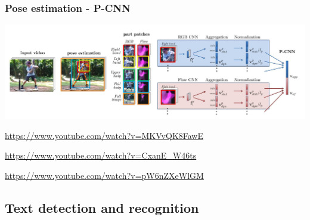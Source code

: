 \begin{frame}
	\frametitle{Pose estimation - P-CNN}
	
	
	\begin{center}
		\includegraphics[scale=0.5]{figs/P_CNN_structure}
	\end{center}
	
	\bigskip 
	
	
	\url{https://www.youtube.com/watch?v=MKVvQK8FawE}
	
	\bigskip 
	
	
	\url{https://www.youtube.com/watch?v=CxanE_W46ts}
	
	\bigskip 
	
	
	\url{https://www.youtube.com/watch?v=pW6nZXeWlGM}
\end{frame}


\subsection{Text detection and recognition}

